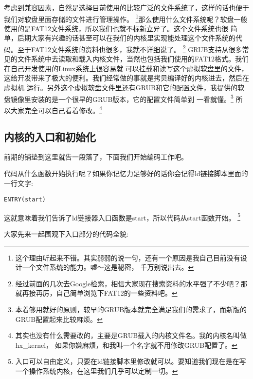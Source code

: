 \par 考虑到兼容因素，自然是选择目前使用的比较广泛的文件系统了，这样的话也便于我们对软盘里面存储的文件进行管理操作。\allowbreak
\footnote{这个理由听起来不错。其实弱弱的说一句，还有一个原因是我自己目前没有设计一个文件系统的能力。嘘～这是秘密，\allowbreak
千万别说出去。}那么使用什么文件系统呢？软盘一般使用的是FAT12文件系统，所以我们也就不标新立异了。这个文件系统也很\allowbreak
简单，后期大家有兴趣的话甚至可以在我们的内核里实现能处理这个文件系统的代码。至于FAT12文件系统的资料也很多，我就不详细说了。\allowbreak
\footnote{经过前面的几次去Google检索，相信大家现在搜索资料的水平强了不少吧？那就再接再厉，自己简单浏览下FAT12的一些资料吧。}\allowbreak
GRUB支持从很多常见的文件系统中去读取和载入内核文件，当然也包括我们使用的FAT12格式。我们在自己开发使用的Linux系统上很容易就\allowbreak
可以挂载和读写这个虚拟软盘里的文件，这给开发带来了极大的便利。我们经常做的事就是拷贝编译好的内核进去，然后在虚拟机\allowbreak
运行。另外这个虚拟软盘文件里还有GRUB和它的配置文件，我提供的软盘镜像里安装的是一个很早的GRUB版本，它的配置文件简单到\allowbreak
一看就懂。\footnote{本着够用就好的原则，较早的GRUB版本就完全满足我们的需求了，而新版的GRUB配置起来比较麻烦。}\allowbreak
所以大家完全可以自己看着修改。\footnote{其实也没有什么需要改的，主要是GRUB载入的内核文件名。我的内核名叫做hx\_kernel，\allowbreak
如果你嫌麻烦，和我叫一个名字就不用修改GRUB配置了。}

\subsection{内核的入口和初始化}

\par 前期的铺垫到这里就告一段落了，下面我们开始编码工作吧。

\par 代码从什么函数开始执行呢？如果你记忆力足够好的话你会记得ld链接脚本里面的一行文字:

\begin{Verbatim}[frame=single]
  ENTRY(start)
\end{Verbatim}

\par 这就意味着我们告诉了ld链接器入口函数是start，所以代码从start函数开始。\allowbreak
\footnote{入口可以自由定义，只要在ld链接脚本里修改就可以。要知道我们现在是在写一个操作系统内核，在这里我们几乎可以定制一切。}

\par 大家先来一起围观下入口部分的代码全貌:


